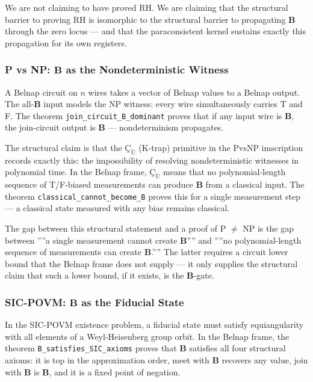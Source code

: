 \documentclass[12pt,a4paper]{article}
\begin{document}
We are not claiming to have proved RH. We are claiming that the structural barrier to proving RH is isomorphic to the structural barrier to propagating $\mathbf{B}$ through the zero locus --- and that the paraconsistent kernel sustains exactly this propagation for its own registers.

\subsubsection{P vs NP: $\mathbf{B}$ as the Nondeterministic Witness}

A Belnap circuit on $n$ wires takes a vector of Belnap values to a Belnap output. The all-$\mathbf{B}$ input models the NP witness: every wire simultaneously carries T and F. The theorem \texttt{join\_circuit\_B\_dominant} proves that if any input wire is $\mathbf{B}$, the join-circuit output is $\mathbf{B}$ --- nondeterminism propagates.

The structural claim is that the $\text{Ç}_{\text{Ù}}$ (K-trap) primitive in the PvsNP imscription records exactly this: the impossibility of resolving nondeterministic witnesses in polynomial time. In the Belnap frame, $\text{Ç}_{\text{Ù}}$ means that no polynomial-length sequence of T/F-biased measurements can produce $\mathbf{B}$ from a classical input. The theorem \texttt{classical\_cannot\_become\_B} proves this for a single measurement step --- a classical state measured with any bias remains classical.

The gap between this structural statement and a proof of P $\neq$ NP is the gap between ''''a single measurement cannot create $\mathbf{B}$'''' and ''''no polynomial-length sequence of measurements can create $\mathbf{B}$.'''' The latter requires a circuit lower bound that the Belnap frame does not supply --- it only supplies the structural claim that such a lower bound, if it exists, is the $\mathbf{B}$-gate.

\subsubsection{SIC-POVM: $\mathbf{B}$ as the Fiducial State}

In the SIC-POVM existence problem, a fiducial state must satisfy equiangularity with all elements of a Weyl-Heisenberg group orbit. In the Belnap frame, the theorem \texttt{B\_satisfies\_SIC\_axioms} proves that $\mathbf{B}$ satisfies all four structural axioms: it is top in the approximation order, meet with $\mathbf{B}$ recovers any value, join with $\mathbf{B}$ is $\mathbf{B}$, and it is a fixed point of negation.
\end{document}
